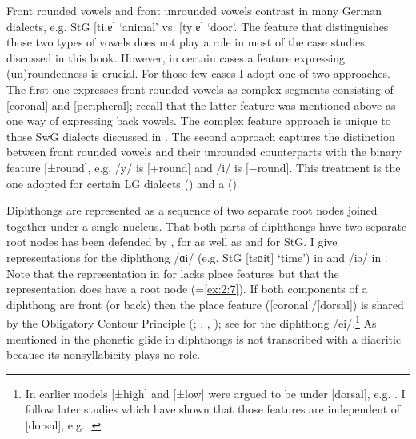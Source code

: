 Front rounded vowels and front unrounded vowels contrast in many German dialects, e.g. StG [tiːɐ] ‘animal’ vs. [tyːɐ] ‘door’. The feature that distinguishes those two types of vowels does not play a role in most of the case studies discussed in this book. However, in certain cases a feature expressing (un)round\-ed\-ness is crucial. For those few cases I adopt one of two approaches. The first one expresses front rounded vowels as complex segments consisting of [coronal] and [peripheral]; recall that the latter feature was mentioned above as one way of expressing back vowels. The complex feature approach is unique to those SwG dialects discussed in . The second approach captures the distinction between front rounded vowels and their unrounded counterparts with the binary feature [±round], e.g. /y/ is [+round] and /i/ is [−round]. This treatment is the one adopted for certain LG dialects () and a  ().

Diphthongs are represented as a sequence of two separate root nodes joined together under a single nucleus. That both parts of diphthongs have two separate root nodes has been defended by \citet{Schane1995}, \citet{Booij1995} for  as well as \citet{Wiese1996a} and \citet{Hall2002} for StG. I give representations for the diphthong /ɑi/ (e.g. StG [tsɑit] ‘time’) in  and /iǝ/ in . Note that the representation in  for  lacks place features but that the representation does have a root node (=\ref{ex:2:7}). If both components of a diphthong are front (or back) then the place feature ([coronal]/[dorsal]) is shared by the Obligatory Contour Principle (; \citealt{Goldsmith1976}, \citealt{McCarthy1986}, \citealt{Yip1988}); see  for the diphthong /ei/.\footnote{In earlier models [±high] and [±low] were argued to be under [dorsal], e.g. \citet{Sagey1986}. I follow later studies which have shown that those features are independent of [dorsal], e.g. \citet{LahiriEvers1991}.} As mentioned in  the phonetic glide in diphthongs is not transcribed with a diacritic because its nonsyllabicity plays no role.


